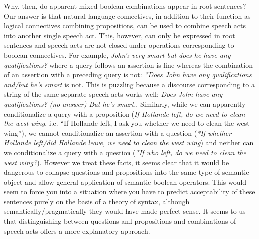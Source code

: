 \documentclass[a4wide]{article}
\begin{document}
Why, then, do apparent mixed boolean combinations appear in root
sentences?  Our answer
is that natural language connectives, in addition to their
function as logical connectives combining propositions, can be used to
combine speech acts into another single speech act.  This, however, can only be expressed in root
sentences and speech acts are not closed under operations
corresponding to boolean connectives.  For
example, \textit{John's very smart but does he have any
  qualifications?} where a query follows an assertion is fine whereas
the combination of an assertion with a preceding query is not:
\textit{*Does John have any qualifications and/but he's smart} is not.
This is puzzling because a discourse corresponding to a string of the
same separate speech acts works well:  \textit{Does John have any
  qualifications? (no answer) But he's smart.}.  Similarly, while we
can apparently conditionalize a query with a proposition
(\textit{If Hollande left, do we need to clean the west wing},
i.e. ``If Hollande left, I ask you whether we need to clean the west
wing''), we cannot conditionalize an assertion with a question
(\textit{*If whether Hollande left/did Hollande leave, we need to
  clean the west wing}) and neither can we conditionalize a query
with a question (\textit{*If who left, do we need to clean the west
  wing?}).  However we treat these facts, it seems
clear that it would be dangerous to collapse questions and
propositions into the same type of semantic object and allow general
application of semantic boolean operators.  This would seem to force
you into a situation where you have to predict acceptability of these
sentences purely on the basis of a theory of syntax, although
semantically/pragmatically they would have made perfect sense.  It
seems to us that distinguishing between questions and propositions and
combinations of speech acts offers a more explanatory approach.



\end{document}
